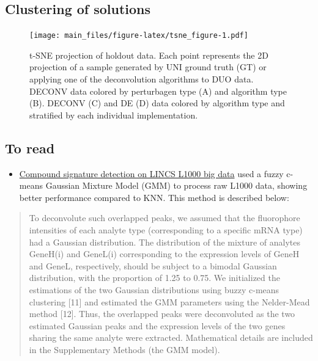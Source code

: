 \documentclass[]{article}
\providecommand{\tightlist}{%
  \setlength{\itemsep}{0pt}\setlength{\parskip}{0pt}}
\begin{document}
\hypertarget{clustering-of-solutions}{%
\subsection{Clustering of solutions}\label{clustering-of-solutions}}

\begin{figure}
\centering
\texttt{[image: main\_files/figure-latex/tsne\_figure-1.pdf]}
\caption{\label{tsne_figure}t-SNE projection of holdout data. Each point
represents the 2D projection of a sample generated by UNI ground truth
(GT) or applying one of the deconvolution algorithms to DUO data. DECONV
data colored by perturbagen type (A) and algorithm type (B). DECONV (C)
and DE (D) data colored by algorithm type and stratified by each
individual implementation.}
\end{figure}

\clearpage

\hypertarget{to-read}{%
\subsection{To read}\label{to-read}}

\begin{itemize}
\tightlist
\item
  \href{https://pubs.rsc.org/en/content/getauthorversionpdf/c4mb00677a}{Compound
  signature detection on LINCS L1000 big data} used a fuzzy c-means
  Gaussian Mixture Model (GMM) to process raw L1000 data, showing better
  performance compared to KNN. This method is described below:
\end{itemize}

\begin{quote}
To deconvolute such overlapped peaks, we assumed that the fluorophore
intensities of each analyte type (corresponding to a specific mRNA type)
had a Gaussian distribution. The distribution of the mixture of analytes
GeneH(i) and GeneL(i) corresponding to the expression levels of GeneH
and GeneL, respectively, should be subject to a bimodal Gaussian
distribution, with the proportion of 1.25 to 0.75. We initialized the
estimations of the two Gaussian distributions using buzzy c-means
clustering {[}11{]} and estimated the GMM parameters using the
Nelder-Mead method {[}12{]}. Thus, the overlapped peaks were
deconvoluted as the two estimated Gaussian peaks and the expression
levels of the two genes sharing the same analyte were extracted.
Mathematical details are included in the Supplementary Methods (the GMM
model).
\end{quote}
\end{document}
